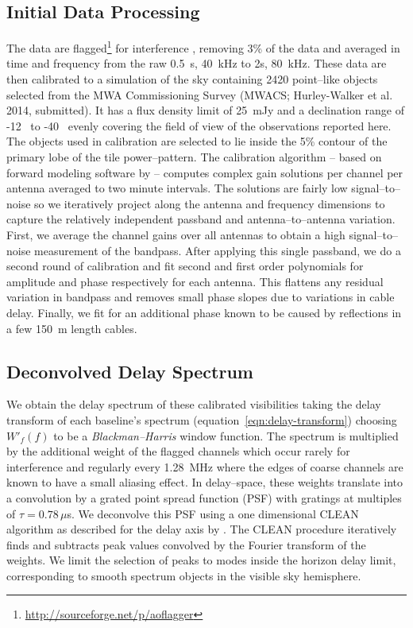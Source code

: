 \documentclass[preprint2,iop,numberedappendix]{emulateapj}
\begin{document}
\subsection{Initial Data Processing}\label{sec:data-analysis}

The data are flagged\footnote{\url{http://sourceforge.net/p/aoflagger}} for interference \citep{off12,off10}, removing 3\% of the data and averaged in time  and frequency from the raw 0.5~s, 40~kHz to 2s, 80~kHz. These data are then calibrated to a simulation of the sky containing 2420 point--like objects selected from the MWA Commissioning Survey (MWACS; Hurley-Walker et al. 2014, submitted). %
It has a flux density limit of 25~mJy and a declination range of -12\arcdeg~ to -40\arcdeg~ evenly covering the field of view of the observations reported here. The objects used in calibration are selected to lie inside the 5\% contour of the primary lobe of the tile power--pattern. The calibration algorithm -- based on forward modeling software by \citet{sul12} -- computes complex gain solutions per channel per antenna averaged to two minute intervals. The solutions are fairly low signal--to--noise so we iteratively project along the antenna and frequency dimensions to capture the relatively independent passband and antenna--to--antenna variation. First, we average the channel gains over all antennas to obtain a high signal--to--noise measurement of the bandpass. After applying this single passband, we do a second round of calibration and fit second and first order polynomials for amplitude and phase respectively for each antenna. This flattens any residual variation in bandpass and removes small phase slopes due to variations in cable delay. Finally, we fit for an additional phase known to be caused by reflections in a few 150~m length cables. %

\subsection{Deconvolved Delay Spectrum}\label{sec:data-delay-spectrum}

We obtain the delay spectrum of these calibrated visibilities taking the delay transform of each baseline's spectrum (equation~\ref{eqn:delay-transform}) choosing $W'_f(f)$ to be a {\it Blackman--Harris} window function. The spectrum is multiplied by the additional weight of the flagged channels which occur rarely for interference and regularly every 1.28~MHz where the edges of coarse channels are known to have a small aliasing effect. In delay--space, these weights translate into a convolution by a grated point spread function (PSF) with gratings at multiples of $\tau=0.78\,\mu$s. We deconvolve this PSF using a one dimensional CLEAN algorithm \citep{tay99} as described for the delay axis by \citet{par09,par12}. The CLEAN procedure iteratively finds and subtracts peak values convolved by the Fourier transform of the weights. We limit the selection of peaks to modes inside the horizon delay limit, corresponding to smooth spectrum objects in the visible sky hemisphere.
\end{document}
